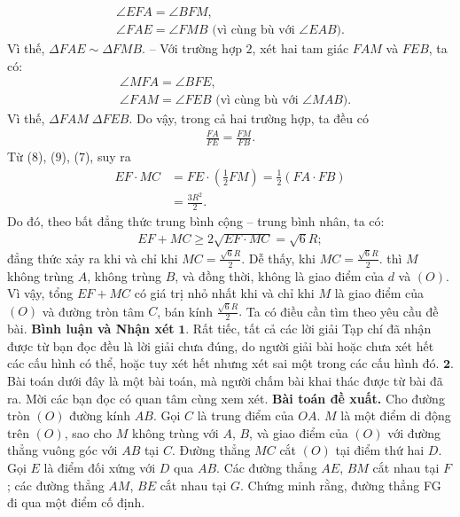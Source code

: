 \begin{multicols}{2}
	\begin{align*}
		\angle EFA = \angle BFM,\\
		\angle FAE = \angle FMB \text{ (vì cùng bù với $\angle EAB$)}.
	\end{align*}
	Vì thế, $\Delta FAE \sim \Delta FMB$.
	\vskip 0.05cm
	-- Với trường hợp $2$, xét hai tam giác $FAM$ và $FEB$, ta có:
	\begin{align*}
		&\angle MFA = \angle BFE,\\
		&\angle FAM = \angle FEB \text{ (vì cùng bù với $\angle MAB$)}.
	\end{align*}
	Vì thế, $\Delta FAM  \Delta FEB$.
	\vskip 0.05cm
	Do vậy, trong cả hai trường hợp, ta đều có
	\begin{align*}
		\frac{FA}{FE} = \frac{FM}{FB}. \tag{$9$}
	\end{align*}
	Từ ($8$), ($9$), ($7$), suy ra
	\begin{align*}
		EF \cdot MC &= FE \cdot \left( {\frac{1}{2}FM} \right) = \frac{1}{2}\left( {FA \cdot FB} \right) \\
		&= \frac{{3{R^2}}}{2}.
	\end{align*}
	Do đó, theo bất đẳng thức trung bình cộng -- trung bình nhân, ta có:
	\begin{align*}
		EF + MC \ge 2\sqrt {EF \cdot MC}  = \sqrt 6 R;
	\end{align*}
	đẳng thức xảy ra khi và chỉ khi $MC = \frac{{\sqrt 6 R}}{2}.$
	\vskip 0.05cm  
	Dễ thấy, khi $MC = \frac{{\sqrt 6 R}}{2}.$  thì $M$ không trùng $A$, không trùng $B$, và đồng thời, không là giao điểm của $d$ và $(O)$.
	\vskip 0.05cm
	Vì vậy, tổng $EF + MC$ có giá trị nhỏ nhất khi và chỉ khi $M$ là giao điểm của $(O)$ và đường tròn tâm $C$, bán kính $\frac{{\sqrt 6 R}}{2}.$ 
	\vskip 0.05cm
	Ta có điều cần tìm theo yêu cầu đề bài.
	\vskip 0.05cm
	\textbf{\color{thachthuctoanhoc}Bình luận và Nhận xét}
	\vskip 0.05cm
	$\pmb{1.}$ Rất tiếc, tất cả các lời giải Tạp chí đã nhận được từ bạn đọc đều là lời giải chưa đúng, do người giải bài hoặc chưa xét hết các cấu hình có thể, hoặc tuy xét hết nhưng xét sai một trong các cấu hình đó.
	\vskip 0.05cm
	$\pmb{2.}$ Bài toán dưới đây là một bài toán, mà người chấm bài khai thác được từ bài đã ra. Mời các bạn đọc có quan tâm cùng xem xét.
	\vskip 0.05cm
	\textbf{\color{thachthuctoanhoc}Bài toán đề xuất.} Cho đường tròn $(O)$ đường kính $AB$. Gọi $C$ là trung điểm của $OA$. $M$ là một điểm di động trên $(O)$, sao cho $M$ không trùng với $A$, $B$, và giao điểm của $(O)$ với đường thẳng vuông góc với $AB$ tại $C$. Đường thẳng $MC$ cắt $(O)$ tại điểm thứ hai $D$. Gọi $E$ là điểm đối xứng với $D$ qua $AB$. Các đường thẳng $AE$, $BM$ cắt nhau tại $F$; các đường thẳng $AM$, $BE$ cắt nhau tại $G$. Chứng minh rằng, đường thẳng FG đi qua một điểm cố định.

\end{multicols}
